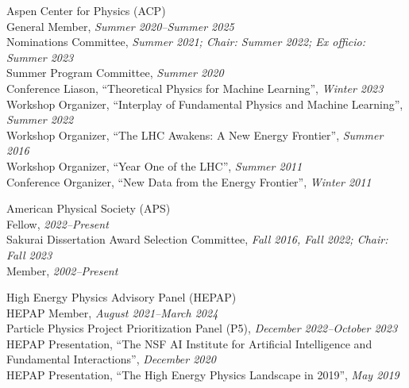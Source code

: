 \item Aspen Center for Physics (ACP)
\\ General Member, \emph{Summer 2020--Summer 2025}
\\ Nominations Committee, \emph{Summer 2021; Chair: Summer 2022; Ex officio: Summer 2023}
\\ Summer Program Committee, \emph{Summer 2020}
\\ Conference Liason, ``Theoretical Physics for Machine Learning'', \emph{Winter 2023}
\\ Workshop Organizer, ``Interplay of Fundamental Physics and Machine Learning'', \emph{Summer 2022}
\\ Workshop Organizer, ``The LHC Awakens: A New Energy Frontier'', \emph{Summer 2016}
\\ Workshop Organizer, ``Year One of the LHC'', \emph{Summer 2011}
\\ Conference Organizer, ``New Data from the Energy Frontier'', \emph{Winter 2011}
\item American Physical Society (APS)
\\ Fellow, \emph{2022--Present}
\\ Sakurai Dissertation Award Selection Committee, \emph{Fall 2016, Fall 2022; Chair: Fall 2023}
\\ Member, \emph{2002--Present}
\item High Energy Physics Advisory Panel (HEPAP)
\\ HEPAP Member, \emph{August 2021--March 2024}
\\ Particle Physics Project Prioritization Panel (P5), \emph{December 2022--October 2023}
\\ HEPAP Presentation, ``The NSF AI Institute for Artificial Intelligence and Fundamental Interactions'', \emph{December 2020}
\\ HEPAP Presentation, ``The High Energy Physics Landscape in 2019'', \emph{May 2019}
